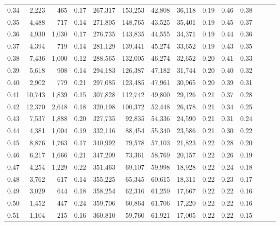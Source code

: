 \begin{tabular}{rrrrrrrrrrrrrr}
0.34 &   2,223 &    465 &  0.17 &  267,317 &  153,253 &  42,808 &  36,118 &  0.19 &  0.46 &      0.38 \\
0.35 &   4,488 &    717 &  0.14 &  271,805 &  148,765 &  43,525 &  35,401 &  0.19 &  0.45 &      0.37 \\
0.36 &   4,930 &  1,030 &  0.17 &  276,735 &  143,835 &  44,555 &  34,371 &  0.19 &  0.44 &      0.36 \\
0.37 &   4,394 &    719 &  0.14 &  281,129 &  139,441 &  45,274 &  33,652 &  0.19 &  0.43 &      0.35 \\
0.38 &   7,436 &  1,000 &  0.12 &  288,565 &  132,005 &  46,274 &  32,652 &  0.20 &  0.41 &      0.33 \\
0.39 &   5,618 &    908 &  0.14 &  294,183 &  126,387 &  47,182 &  31,744 &  0.20 &  0.40 &      0.32 \\
0.40 &   2,902 &    779 &  0.21 &  297,085 &  123,485 &  47,961 &  30,965 &  0.20 &  0.39 &      0.31 \\
0.41 &  10,743 &  1,839 &  0.15 &  307,828 &  112,742 &  49,800 &  29,126 &  0.21 &  0.37 &      0.28 \\
0.42 &  12,370 &  2,648 &  0.18 &  320,198 &  100,372 &  52,448 &  26,478 &  0.21 &  0.34 &      0.25 \\
0.43 &   7,537 &  1,888 &  0.20 &  327,735 &   92,835 &  54,336 &  24,590 &  0.21 &  0.31 &      0.24 \\
0.44 &   4,381 &  1,004 &  0.19 &  332,116 &   88,454 &  55,340 &  23,586 &  0.21 &  0.30 &      0.22 \\
0.45 &   8,876 &  1,763 &  0.17 &  340,992 &   79,578 &  57,103 &  21,823 &  0.22 &  0.28 &      0.20 \\
0.46 &   6,217 &  1,666 &  0.21 &  347,209 &   73,361 &  58,769 &  20,157 &  0.22 &  0.26 &      0.19 \\
0.47 &   4,254 &  1,229 &  0.22 &  351,463 &   69,107 &  59,998 &  18,928 &  0.22 &  0.24 &      0.18 \\
0.48 &   3,762 &    617 &  0.14 &  355,225 &   65,345 &  60,615 &  18,311 &  0.22 &  0.23 &      0.17 \\
0.49 &   3,029 &    644 &  0.18 &  358,254 &   62,316 &  61,259 &  17,667 &  0.22 &  0.22 &      0.16 \\
0.50 &   1,452 &    447 &  0.24 &  359,706 &   60,864 &  61,706 &  17,220 &  0.22 &  0.22 &      0.16 \\
0.51 &   1,104 &    215 &  0.16 &  360,810 &   59,760 &  61,921 &  17,005 &  0.22 &  0.22 &      0.15 \\

\end{tabular}
